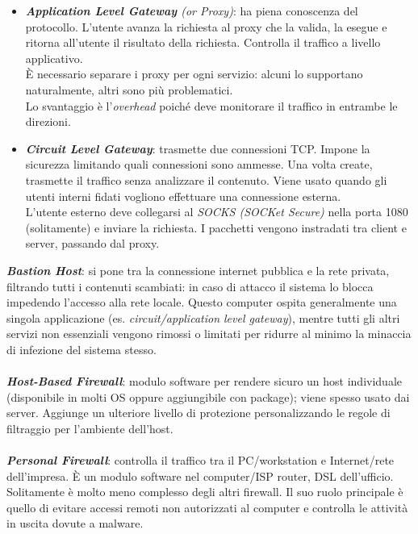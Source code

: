 \documentclass[11pt, a4paper, twoside, italian]{report}
\theoremstyle{plain}
\begin{document}
\begin{itemize}
	\item \textit{\textbf{Application Level Gateway} (or Proxy)}: ha piena conoscenza del protocollo. L'utente avanza la richiesta al proxy che la valida, la esegue e ritorna all'utente il risultato della richiesta. Controlla il traffico a livello applicativo.\\
	È necessario separare i proxy per ogni servizio: alcuni lo supportano naturalmente, altri sono più problematici.\\
	Lo svantaggio è l'\textit{overhead} poiché deve monitorare il traffico in entrambe le direzioni.
	\item \textit{\textbf{Circuit Level Gateway}}: trasmette due connessioni TCP. Impone la sicurezza limitando quali connessioni sono ammesse. Una volta create, trasmette il traffico senza analizzare il contenuto. Viene usato quando gli utenti interni fidati vogliono effettuare una connessione esterna.\\
	L'utente esterno deve collegarsi al \textit{SOCKS (SOCKet Secure)} nella porta 1080 (solitamente) e inviare la richiesta. I pacchetti vengono instradati tra client e server, passando dal proxy.
\end{itemize}
\noindent
\textit{\textbf{Bastion Host}}: si pone tra la connessione internet pubblica e la rete privata, filtrando tutti i contenuti scambiati: in caso di attacco il sistema lo blocca impedendo l'accesso alla rete locale. Questo computer ospita generalmente una singola applicazione (es. \textit{circuit/application level gateway}), mentre tutti gli altri servizi non essenziali vengono rimossi o limitati per ridurre al minimo la minaccia di infezione del sistema stesso.\\
\\
\textit{\textbf{Host-Based Firewall}}: modulo software per rendere sicuro un host individuale (disponibile in molti OS oppure aggiungibile con package); viene spesso usato dai server. Aggiunge un ulteriore livello di protezione personalizzando le regole di filtraggio per l'ambiente dell'host.\\
\\
\textit{\textbf{Personal Firewall}}: controlla il traffico tra il PC/workstation e Internet/rete dell'impresa. È un modulo software nel computer/ISP router, DSL dell'ufficio. Solitamente è molto meno complesso degli altri firewall. Il suo ruolo principale è quello di evitare accessi remoti non autorizzati al computer e controlla le attività in uscita dovute a malware.
\end{document}
